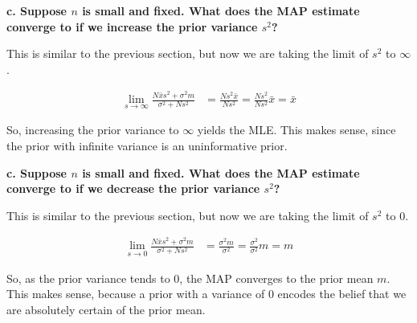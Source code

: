 {\textbf{c. Suppose $n$ is small and fixed. What does the MAP estimate converge
to if we increase the prior variance $s^2$?}

This is similar to the previous section, but now we are taking the limit of
$s^2$ to $\infty$.

\begin{align}
    \lim_{s\rightarrow \infty} \frac{N\bar{x}s^2+\sigma^2m}{\sigma^2+Ns^2} & =
    \frac{Ns^2\bar{x}}{Ns^2} = \frac{Ns^2}{Ns^2}\bar{x} = \bar{x}
\end{align}

So, increasing the prior variance to $\infty$ yields the MLE. This makes sense,
since the prior with infinite variance is an uninformative prior.

\textbf{c. Suppose $n$ is small and fixed. What does the MAP estimate converge
to if we decrease the prior variance $s^2$?}

This is similar to the previous section, but now we are taking the limit of
$s^2$ to $0$.

\begin{align}
    \lim_{s\rightarrow 0} \frac{N\bar{x}s^2+\sigma^2m}{\sigma^2+Ns^2} & =
    \frac{\sigma^2m}{\sigma^2} = \frac{\sigma^2}{\sigma^2}m = m
\end{align}

So, as the prior variance tends to $0$, the MAP converges to the prior mean $m$.
This makes sense, because a prior with a variance of $0$ encodes the belief
that we are absolutely certain of the prior mean.

}

